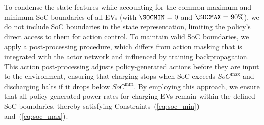 To condense the state features while accounting for the common maximum and minimum SoC boundaries of all EVs (with $\SOCMIN=0$ and $\SOCMAX=90\%$), we do not include SoC boundaries in the state representation, limiting the policy's direct access to them for action control. To maintain valid SoC boundaries, we apply a post-processing procedure, which differs from action masking that is integrated with the actor network and influenced by training backpropagation. This action post-processing adjusts policy-generated actions before they are input to the environment, ensuring that charging stops when SoC exceeds $SoC^{\text{max}}$ and discharging halts if it drops below $SoC^{\text{min}}$. 
By employing this approach, we ensure that all policy-generated power rates for charging EVs remain within the defined SoC boundaries, thereby satisfying Constraints~(\ref{eq:soc_min}) and~(\ref{eq:soc_max}).

